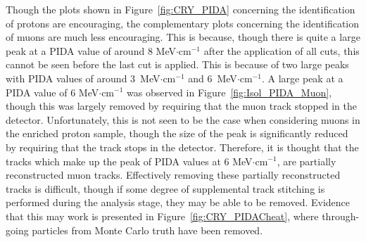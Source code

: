 Though the plots shown in Figure~\ref{fig:CRY_PIDA} concerning the identification of protons are encouraging, the complementary plots concerning the identification of muons are much less encouraging. This is because, though there is quite a large peak at a PIDA value of around 8 MeV$\cdot$cm$^{-1}$ after the application of all cuts, this cannot be seen before the last cut is applied. This is because of two large peaks with PIDA values of around 3~MeV$\cdot$cm$^{-1}$ and 6~MeV$\cdot$cm$^{-1}$. A large peak at a PIDA value of 6 MeV$\cdot$cm$^{-1}$ was observed in Figure~\ref{fig:Isol_PIDA_Muon}, though this was largely removed by requiring that the muon track stopped in the detector. Unfortunately, this is not seen to be the case when considering muons in the enriched proton sample, though the size of the peak is significantly reduced by requiring that the track stops in the detector. Therefore, it is thought that the tracks which make up the peak of PIDA values at 6 MeV$\cdot$cm$^{-1}$, are partially reconstructed muon tracks. Effectively removing these partially reconstructed tracks is difficult, though if some degree of supplemental track stitching is performed during the analysis stage, they may be able to be removed. Evidence that this may work is presented in Figure~\ref{fig:CRY_PIDACheat}, where through-going particles from Monte Carlo truth have been removed. \\


